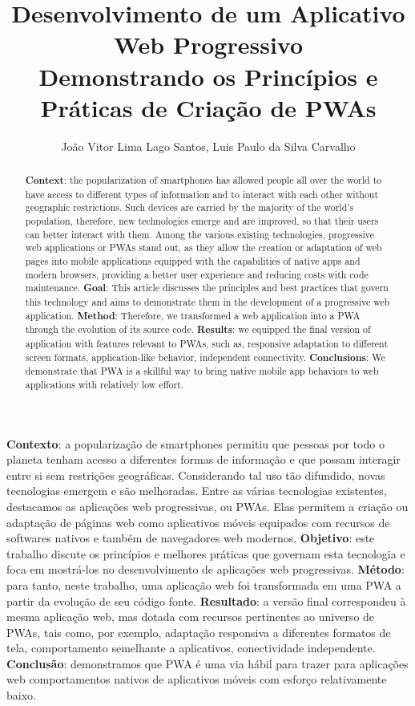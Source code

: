 \documentclass[12pt]{article}
\title{Desenvolvimento de um Aplicativo Web Progressivo\\Demonstrando os Princípios e Práticas de Criação de PWAs}
\author{João Vitor Lima Lago Santos, Luis Paulo da Silva Carvalho}
\begin{document}
 

\maketitle

\begin{abstract}
\textbf{Context}: the popularization of smartphones has allowed people all over the world to have access to different types of information and to interact with each other without geographic restrictions. Such devices are carried by the majority of the world's population, therefore, new technologies emerge and are improved, so that their users can better interact with them. Among the various existing technologies, progressive web applications or PWAs stand out, as they allow the creation or adaptation of web pages into mobile applications equipped with the capabilities of native apps and modern browsers, providing a better user experience and reducing costs with code maintenance. \textbf{Goal}: This article discusses the principles and best practices that govern this technology and aims to demonstrate them in the development of a progressive web application. \textbf{Method}: Therefore, we transformed a web application into a PWA through the evolution of its source code. \textbf{Results}: we equipped the final version of application with features relevant to PWAs, such as, responsive adaptation to different screen formats, application-like behavior, independent connectivity. \textbf{Conclusions}: We demonstrate that PWA is a skillful way to bring native mobile app behaviors to web applications with relatively low effort.

\end{abstract}
     
\begin{resumo} 
\textbf{Contexto}: a popularização de smartphones permitiu que pessoas por todo o planeta tenham acesso a diferentes formas de informação e que possam interagir entre si sem restrições geográficas. Considerando tal uso tão difundido, novas tecnologias emergem e são melhoradas. Entre as várias tecnologias existentes, destacamos as aplicações web progressivas, ou PWAs. Elas permitem a criação ou adaptação de páginas web como aplicativos móveis equipados com recursos de softwares nativos e também de navegadores web modernos. \textbf{Objetivo}: este trabalho discute os princípios e melhores práticas que governam esta tecnologia e foca em mostrá-los no desenvolvimento de aplicações web progressivas. \textbf{Método}: para tanto, neste trabalho, uma aplicação web foi transformada em uma PWA a partir da evolução de seu código fonte. \textbf{Resultado}: a versão final correspondeu à mesma aplicação web, mas dotada com recursos pertinentes ao universo de PWAs, tais como, por exemplo, adaptação responsiva a diferentes formatos de tela, comportamento semelhante a aplicativos, conectividade independente. \textbf{Conclusão}: demonstramos que PWA é uma via hábil para trazer para aplicações web comportamentos nativos de aplicativos móveis com esforço relativamente baixo.  
\end{resumo}
\end{document}

